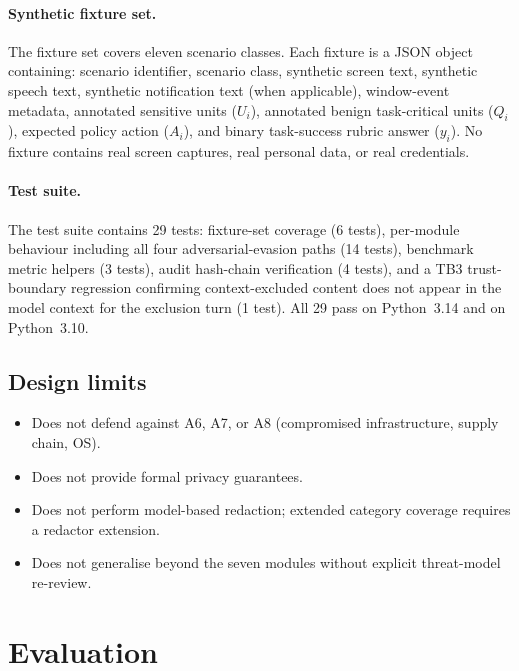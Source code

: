 \documentclass[sn-mathphys-num]{sn-jnl}
\begin{document}
\paragraph{Synthetic fixture set.}
The fixture set covers eleven scenario classes. Each fixture is a JSON object
containing: scenario identifier, scenario class, synthetic screen text,
synthetic speech text, synthetic notification text (when applicable),
window-event metadata, annotated sensitive units ($U_i$), annotated benign
task-critical units ($Q_i$), expected policy action ($A_i$), and binary
task-success rubric answer ($y_i$). No fixture contains real screen captures,
real personal data, or real credentials.

\paragraph{Test suite.}
The test suite contains 29 tests: fixture-set coverage (6 tests), per-module
behaviour including all four adversarial-evasion paths (14 tests), benchmark
metric helpers (3 tests), audit hash-chain verification (4 tests), and a TB3
trust-boundary regression confirming context-excluded content does not appear in
the model context for the exclusion turn (1 test). All 29 pass on Python~3.14
and on Python~3.10.

\subsection{Design limits}\label{sec:designlimits}

\begin{itemize}
  \item Does not defend against A6, A7, or A8 (compromised infrastructure,
        supply chain, OS).
  \item Does not provide formal privacy guarantees.
  \item Does not perform model-based redaction; extended category coverage
        requires a redactor extension.
  \item Does not generalise beyond the seven modules without explicit
        threat-model re-review.
\end{itemize}

\section{Evaluation}\label{sec:eval}
\end{document}
